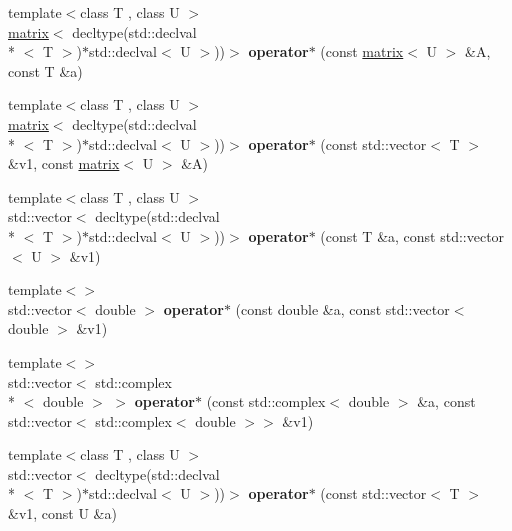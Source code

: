 \begin{DoxyCompactItemize}
\item 
\hypertarget{namespacekeycpp_ae187563f8f86e256bc1394edcba1b2b1}{{\footnotesize template$<$class T , class U $>$ }\\\hyperlink{classkeycpp_1_1matrix}{matrix}$<$ decltype(std\-::declval\\*
$<$ T $>$)$\ast$std\-::declval$<$ U $>$))$>$ {\bfseries operator$\ast$} (const \hyperlink{classkeycpp_1_1matrix}{matrix}$<$ U $>$ \&A, const T \&a)}\label{namespacekeycpp_ae187563f8f86e256bc1394edcba1b2b1}

\item 
\hypertarget{namespacekeycpp_a6dcf10b0db68d53d126803e8d6d591fb}{{\footnotesize template$<$class T , class U $>$ }\\\hyperlink{classkeycpp_1_1matrix}{matrix}$<$ decltype(std\-::declval\\*
$<$ T $>$)$\ast$std\-::declval$<$ U $>$))$>$ {\bfseries operator$\ast$} (const std\-::vector$<$ T $>$ \&v1, const \hyperlink{classkeycpp_1_1matrix}{matrix}$<$ U $>$ \&A)}\label{namespacekeycpp_a6dcf10b0db68d53d126803e8d6d591fb}

\item 
\hypertarget{namespacekeycpp_a4b523ff3dd5abac240788f6efb2e554e}{{\footnotesize template$<$class T , class U $>$ }\\std\-::vector$<$ decltype(std\-::declval\\*
$<$ T $>$)$\ast$std\-::declval$<$ U $>$))$>$ {\bfseries operator$\ast$} (const T \&a, const std\-::vector$<$ U $>$ \&v1)}\label{namespacekeycpp_a4b523ff3dd5abac240788f6efb2e554e}

\item 
\hypertarget{namespacekeycpp_a7597ecfbaa85ebc27a72c6fb1af00b60}{{\footnotesize template$<$$>$ }\\std\-::vector$<$ double $>$ {\bfseries operator$\ast$} (const double \&a, const std\-::vector$<$ double $>$ \&v1)}\label{namespacekeycpp_a7597ecfbaa85ebc27a72c6fb1af00b60}

\item 
\hypertarget{namespacekeycpp_a18334ab0064b1d634182170898bf975c}{{\footnotesize template$<$$>$ }\\std\-::vector$<$ std\-::complex\\*
$<$ double $>$ $>$ {\bfseries operator$\ast$} (const std\-::complex$<$ double $>$ \&a, const std\-::vector$<$ std\-::complex$<$ double $>$$>$ \&v1)}\label{namespacekeycpp_a18334ab0064b1d634182170898bf975c}

\item 
\hypertarget{namespacekeycpp_aa2e9a06b12f7df18005a3daa3c051b2c}{{\footnotesize template$<$class T , class U $>$ }\\std\-::vector$<$ decltype(std\-::declval\\*
$<$ T $>$)$\ast$std\-::declval$<$ U $>$))$>$ {\bfseries operator$\ast$} (const std\-::vector$<$ T $>$ \&v1, const U \&a)}\label{namespacekeycpp_aa2e9a06b12f7df18005a3daa3c051b2c}


\end{DoxyCompactItemize}
